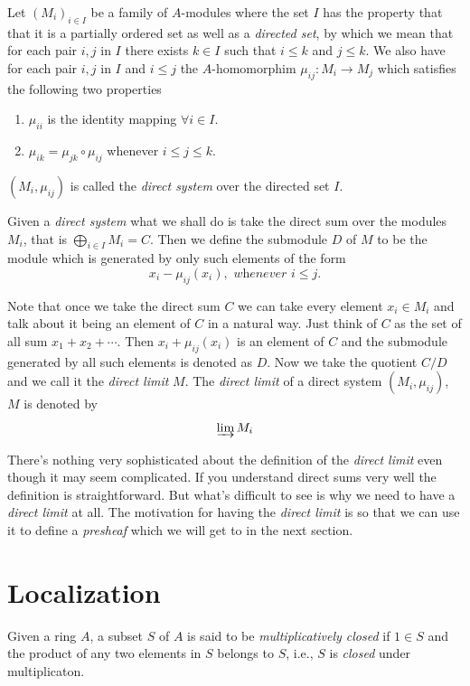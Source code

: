 \documentclass[]{report}
\begin{document}
Let $(M_i)_{i\in I}$ be a family of $A$-modules where the set $I$ has the property that that it is a partially ordered set as well as a \textit{directed set}, by which we mean that for each pair $i,j$ in $I$ there exists $k\in I$ such that $i\leq k$ and $j\leq k$. We also have for each pair $i,j$ in $I$ and $i\leq j$ the $A$-homomorphim $\mu_{ij}: M_i \rightarrow M_j$ which satisfies the following two properties
\begin{enumerate}
    \item $\mu_{ii}$ is the identity mapping $\forall i\in I$.
    \item $\mu_{ik} = \mu_{jk}\circ \mu_{ij}$ whenever $i\leq j\leq k$.
\end{enumerate}

$(M_i,\mu_{ij})$ is called the \textit{direct system} over the directed set $I$.

Given a \textit{direct system} what we shall do is take the direct sum over the modules $M_i$, that is $\bigoplus_{i\in I} M_i = C$. Then we define the submodule $D$ of $M$ to be the module which is generated by only such elements of the form
$$x_i - \mu_{ij}(x_i), \textit{ whenever } i\leq j.$$

Note that once we take the direct sum $C$ we can take every element $x_i\in M_i$ and talk about it being an element of $C$ in a natural way. Just think of $C$ as the set of all sum $x_1  + x_2 + \cdots$. Then $x_i + \mu_{ij}(x_i)$ is an element of $C$ and the submodule generated by all such elements is denoted as $D$. Now we take the quotient $C/D$ and we call it the \textit{direct limit} $M$. The \textit{direct limit} of a direct system $(M_i, \mu_{ij})$, $M$ is denoted by
    $$\varinjlim M_i$$

There's nothing very sophisticated about the definition of the \textit{direct limit} even though it may seem complicated. If you understand direct sums very well the definition is straightforward. But what's difficult to see is why we need to have a \textit{direct limit} at all. The motivation for having the \textit{direct limit} is so that we can use it to define a \textit{presheaf} which we will get to in the next section. 


\chapter{Localization}

Given a ring $A$, a subset $S$ of $A$ is said to be \textit{multiplicatively closed} if $1\in S$ and the product of any two elements in $S$ belongs to $S$, i.e., $S$ is \textit{closed} under multiplicaton. 
\end{document}
